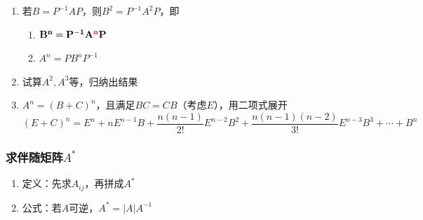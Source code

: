 \documentclass[./linear_algebra.tex]{subfiles}
\begin{document}
\begin{enumerate}
        则：
        \[
            A^2 =
            \begin{bmatrix}
                0      & 0      & b_{13} & \dots  & b_{1n} \\
                0      & 0      & 0      & \dots  & b_{2n} \\
                0      & 0      & 0      & \dots  & b_{3n} \\
                \vdots & \vdots & \vdots & \ddots & \vdots \\
                0      & 0      & 0      & \dots  & 0
            \end{bmatrix}, \quad
            A^3 =
            \begin{bmatrix}
                0      & 0      & 0      & c_{14} & \dots  & c_{1n} \\
                0      & 0      & 0      & 0      & \dots  & c_{2n} \\
                0      & 0      & 0      & 0      & \dots  & c_{3n} \\
                \vdots & \vdots & \vdots & \vdots & \ddots & \vdots \\
                0      & 0      & 0      & 0      & \dots  & 0
            \end{bmatrix}
        \]
        \[
            A^n = 0, \quad A^k = 0 \; \text{当} k \ge n
        \]
        \item 若$B = P^{-1}AP$，则$B^2 = P^{-1}A^{2}P$，即
        \begin{enumerate}
            \item $\mathbf{B^n = P^{-1}A^{\color{red}{n}}P}$
            \item $A^n = PB^{n}P^{-1}$
        \end{enumerate}
        \item 试算$A^2, A^3$等，归纳出结果
        \item $A^n = (B + C)^n$，且满足$BC = CB$（考虑$E$），用二项式展开
        \[
            (E + C)^n = E^n + nE^{n-1}B + \dfrac{n(n-1)}{2!}E^{n-2}B^2 + \dfrac{n(n-1)(n-2)}{3!}E^{n-3}B^3 + \cdots + B^n
        \]
    \end{enumerate}

    \subsubsection{求伴随矩阵$A^*$}

    \begin{enumerate}
        \item 定义：先求$A_{ij}$，再拼成$A^*$
        \item 公式：若$A$可逆，$A^* = |A|A^{-1}$
    \end{enumerate}
\end{document}
